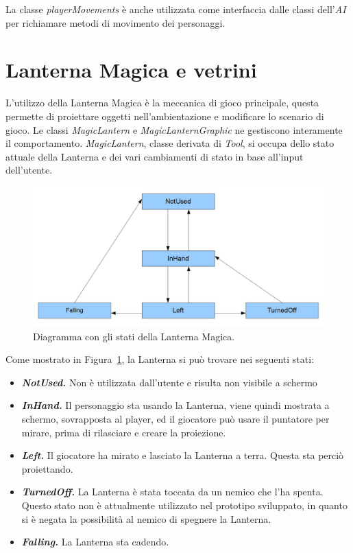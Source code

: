 La classe \textit{playerMovements} è anche utilizzata come interfaccia dalle classi dell’\textit{AI} per richiamare metodi di movimento dei personaggi.

\section{Lanterna Magica e vetrini}

L’utilizzo della Lanterna Magica è la meccanica di gioco principale, questa permette di proiettare oggetti nell’ambientazione e modificare lo scenario di gioco.
Le classi \textit{MagicLantern} e \textit{MagicLanternGraphic} ne gestiscono interamente il comportamento.
\textit{MagicLantern}, classe derivata di \textit{Tool}, si occupa dello stato attuale della Lanterna e dei vari cambiamenti di stato in base all’input dell’utente.

\begin{figure}%
	\centering
	\includegraphics[width= 0.9\columnwidth]{images/development/lanterna.jpg}
	\caption{Diagramma con gli stati della Lanterna Magica.}
	\label{fig:development_lanterna_stati}
\end{figure}

Come mostrato in Figura~\ref{fig:development_lanterna_stati}, la Lanterna si può trovare nei seguenti stati:

\begin{itemize}
	\item \textit{\textbf{NotUsed.}} Non è utilizzata dall’utente e risulta non visibile a schermo
	\item \textit{\textbf{InHand.}} Il personaggio sta usando la Lanterna, viene quindi mostrata a schermo, sovrapposta al player, ed il giocatore può usare il puntatore per mirare, prima di rilasciare e creare la proiezione.
	\item \textit{\textbf{Left.}} Il giocatore ha mirato e lasciato la Lanterna a terra. Questa sta perciò proiettando.
	\item \textit{\textbf{TurnedOff.}} La Lanterna è stata toccata da un nemico che l’ha spenta. Questo stato non è attualmente utilizzato nel prototipo sviluppato, in quanto si è negata la possibilità al nemico di spegnere la Lanterna.
	\item \textit{\textbf{Falling.}} La Lanterna sta cadendo.
\end{itemize}

